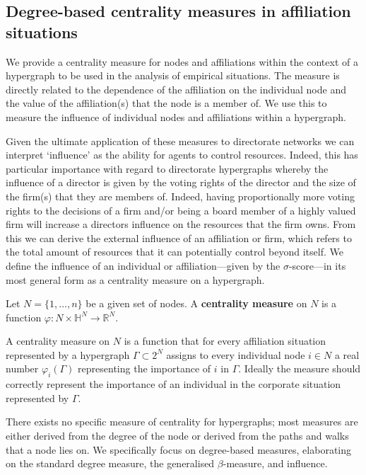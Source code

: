 \subsection{Degree-based centrality measures in affiliation situations} 
\label{degreecentralities}

We provide a centrality measure for nodes and affiliations within the context of a hypergraph to be used in the analysis of empirical situations. The measure is directly related to the dependence of the affiliation on the individual node and the value of the affiliation(s) that the node is a member of. We use this to measure the influence of individual nodes and affiliations within a hypergraph.

Given the ultimate application of these measures to directorate networks we can interpret `influence' as the ability for agents to control resources. Indeed, this has particular importance with regard to directorate hypergraphs whereby the influence of a director is given by the voting rights of the director and the size of the firm(s) that they are members of. Indeed, having proportionally more voting rights to the decisions of a firm and/or being a board member of a highly valued firm will increase a directors influence on the resources that the firm owns. From this we can derive the external influence of an affiliation or firm, which refers to the total amount of resources that it can potentially control beyond itself. We define the influence of an individual or affiliation---given by the $\sigma$-score---in its most general form as a centrality measure on a hypergraph.
\begin{definition}
Let $N = \{ 1, \ldots ,n \}$ be a given set of nodes. A \textbf{centrality measure} on $N$ is a function $\varphi \colon N \times \mathbb{H}^N \to \mathbb{R}^N$.
\end{definition}
A centrality measure on $N$ is a function that for every affiliation situation represented by a hypergraph $\Gamma \subset 2^N$ assigns to every individual node $i \in N$ a real number $\varphi_i ( \Gamma )$ representing the importance of $i$ in $\Gamma$. Ideally the measure should correctly represent the importance of an individual in the corporate situation represented by $\Gamma$.

There exists no specific measure of centrality for hypergraphs; most measures are either derived from the degree of the node or derived from the paths and walks that a node lies on. We specifically focus on degree-based measures, elaborating on the standard degree measure, the generalised $\beta$-measure, and influence.

